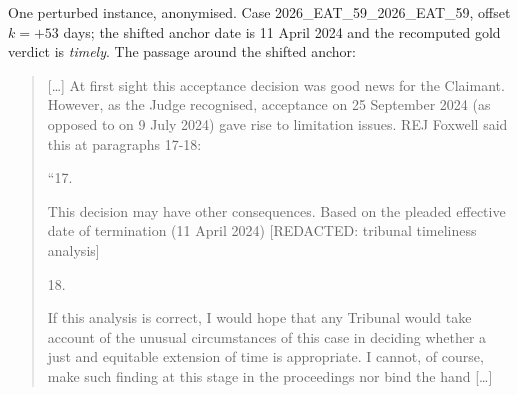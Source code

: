 One perturbed instance, anonymised. Case 2026_EAT_59\_2026\_EAT\_59,
offset $k=+53$ days; the shifted anchor date is 11 April 2024 and
the recomputed gold verdict is \emph{timely}. The passage around the
shifted anchor:

\begin{quote}\small
[\ldots] At first sight this acceptance decision was good news for the Claimant. However, as the Judge recognised, acceptance on 25 September 2024 (as opposed to on 9 July 2024) gave rise to limitation issues. REJ Foxwell said this at paragraphs 17-18: 

 “17. 

 This decision may have other consequences. Based on the pleaded effective date of termination (11 April 2024) [REDACTED: tribunal timeliness analysis]

 18. 

 If this analysis is correct, I would hope that any Tribunal would take account of the unusual circumstances of this case in deciding whether a just and equitable extension of time is appropriate. I cannot, of course, make such finding at this stage in the proceedings nor bind the hand [\ldots]
\end{quote}
